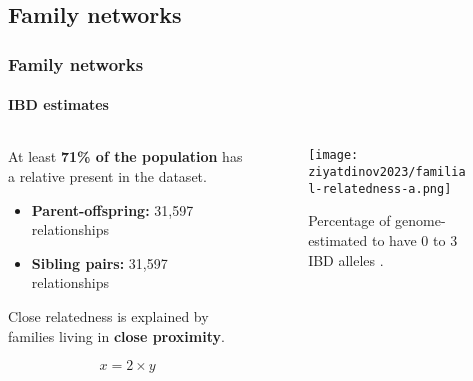 \subsection{Family networks}
\begin{frame}
    \frametitle{Family networks}
    \framesubtitle{IBD estimates}

    \begin{columns}
        \begin{column}{0.5\textwidth}

            At least \textbf{\color{primary-color} 71\% of the population} has a relative present in the dataset.

            \begin{itemize}[label=$\bullet$,noitemsep,topsep=5pt]
                \item \textbf{Parent-offspring:} 31,597 relationships
                \item \textbf{Sibling pairs:} 31,597 relationships
            \end{itemize}

            Close relatedness is explained by families living in \textbf{close proximity}.

            \begin{equation}
              x = 2 \times y
            \end{equation}

        \end{column}
        \begin{column}{0.5\textwidth}
            \begin{figure}[htpb]
                \centering
                \texttt{[image: ziyatdinov2023/familial-relatedness-a.png]}
                \caption{Percentage of genome-estimated to have 0 to 3 IBD alleles \parencite{ziyatdinov2023}.}
                \label{fig:percent-genome-ibd}
            \end{figure}
        \end{column}
    \end{columns}

\end{frame}

